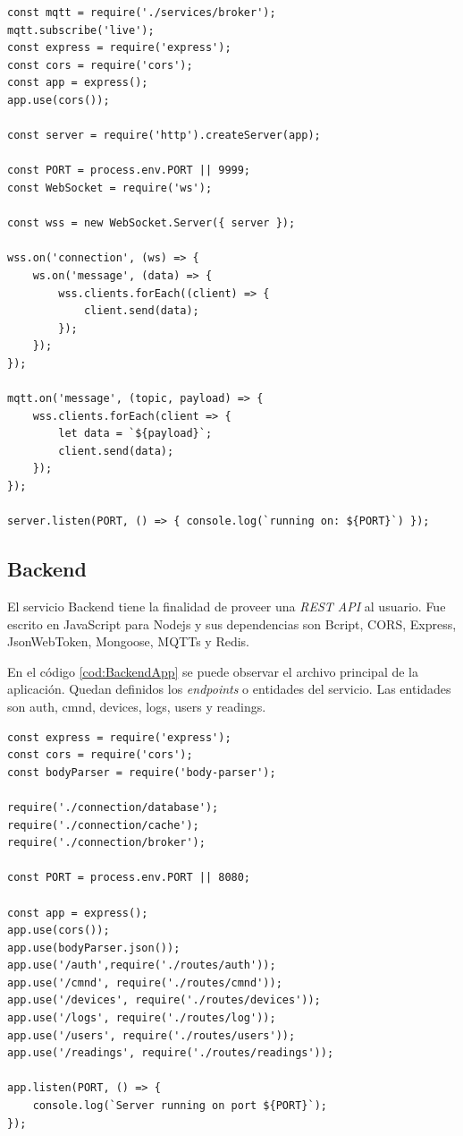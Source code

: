 \begin{lstlisting}[label=cod:Calibrator,caption=Archivo principal del servicio Calibrator]
const mqtt = require('./services/broker');
mqtt.subscribe('live');
const express = require('express');
const cors = require('cors');
const app = express();
app.use(cors());

const server = require('http').createServer(app);

const PORT = process.env.PORT || 9999;
const WebSocket = require('ws');

const wss = new WebSocket.Server({ server });

wss.on('connection', (ws) => {
    ws.on('message', (data) => {
        wss.clients.forEach((client) => {
            client.send(data);
        });
    });
});

mqtt.on('message', (topic, payload) => {
    wss.clients.forEach(client => {
        let data = `${payload}`;
        client.send(data);
    });
});

server.listen(PORT, () => { console.log(`running on: ${PORT}`) }); 
\end{lstlisting}

\subsection{Backend}
El servicio Backend tiene la finalidad de proveer una \emph{REST API} al usuario.
Fue escrito en JavaScript para Nodejs y sus dependencias son Bcript, CORS, Express, JsonWebToken, Mongoose, MQTTs y Redis.

En el código \ref{cod:BackendApp} se puede observar el archivo principal de la aplicación.
Quedan definidos los \emph{endpoints} o entidades del servicio.
Las entidades son auth, cmnd, devices, logs, users y readings.


\begin{lstlisting}[label=cod:BackendApp,caption=Archivo principal del servicio Backend]
const express = require('express');
const cors = require('cors');
const bodyParser = require('body-parser');

require('./connection/database');
require('./connection/cache');
require('./connection/broker');

const PORT = process.env.PORT || 8080;

const app = express();
app.use(cors());
app.use(bodyParser.json());
app.use('/auth',require('./routes/auth'));
app.use('/cmnd', require('./routes/cmnd'));
app.use('/devices', require('./routes/devices'));
app.use('/logs', require('./routes/log'));
app.use('/users', require('./routes/users'));
app.use('/readings', require('./routes/readings'));

app.listen(PORT, () => { 
    console.log(`Server running on port ${PORT}`); 
});
\end{lstlisting}

